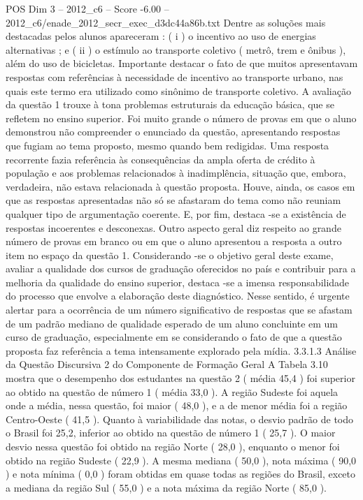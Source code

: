 \begin{textsample}{POS Dim 3 – 2012\_c6 – Score -6.00 – 2012\_c6/enade\_2012\_secr\_exec\_d3dc44a86b.txt}
Dentre as soluções mais destacadas pelos alunos apareceram : ( i ) o incentivo ao uso de energias alternativas ; e ( ii ) o estímulo ao transporte coletivo ( metrô, trem e ônibus ), além do uso de bicicletas.
Importante destacar o fato de que muitos apresentavam respostas com referências à necessidade de incentivo ao transporte urbano, nas quais este termo era utilizado como sinônimo de transporte coletivo.
A avaliação da questão 1 trouxe à tona problemas estruturais da educação básica, que se refletem no ensino superior.
Foi muito grande o número de provas em que o aluno demonstrou não compreender o enunciado da questão, apresentando respostas que fugiam ao tema proposto, mesmo quando bem redigidas.
Uma resposta recorrente fazia referência às consequências da ampla oferta de crédito à população e aos problemas relacionados à inadimplência, situação que, embora, verdadeira, não estava relacionada à questão proposta.
Houve, ainda, os casos em que as respostas apresentadas não só se afastaram do tema como não reuniam qualquer tipo de argumentação coerente.
E, por fim, destaca -se a existência de respostas incoerentes e desconexas.
Outro aspecto geral diz respeito ao grande número de provas em branco ou em que o aluno apresentou a resposta a outro item no espaço da questão 1.
Considerando -se o objetivo geral deste exame, avaliar a qualidade dos cursos de graduação oferecidos no país e contribuir para a melhoria da qualidade do ensino superior, destaca -se a imensa responsabilidade do processo que envolve a elaboração deste diagnóstico.
Nesse sentido, é urgente alertar para a ocorrência de um número significativo de respostas que se afastam de um padrão mediano de qualidade esperado de um aluno concluinte em um curso de graduação, especialmente em se considerando o fato de que a questão proposta faz referência a tema intensamente explorado pela mídia. 3.3.1.3 Análise da Questão Discursiva 2 do Componente de Formação Geral A Tabela 3.10 mostra que o desempenho dos estudantes na questão 2 ( média 45,4 ) foi superior ao obtido na questão de número 1 ( média 33,0 ).
A região Sudeste foi aquela onde a média, nessa questão, foi maior ( 48,0 ), e a de menor média foi a região Centro-Oeste ( 41,5 ).
Quanto à variabilidade das notas, o desvio padrão de todo o Brasil foi 25,2, inferior ao obtido na questão de número 1 ( 25,7 ).
O maior desvio nessa questão foi obtido na região Norte ( 28,0 ), enquanto o menor foi obtido na região Sudeste ( 22,9 ).
A mesma mediana ( 50,0 ), nota máxima ( 90,0 ) e nota mínima ( 0,0 ) foram obtidas em quase todas as regiões do Brasil, exceto a mediana da região Sul ( 55,0 ) e a nota máxima da região Norte ( 85,0 ).

\end{textsample}
